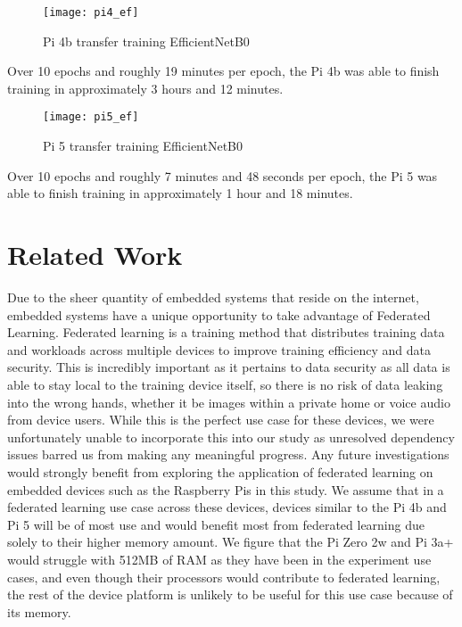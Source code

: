 \documentclass{article}
\begin{document}
\begin{multicols}{2}
\begin{figure}[H]
\texttt{[image: pi4\_ef]}
\centering
\caption{Pi 4b transfer training EfficientNetB0}
\label{fig:pi4_ef}
\end{figure}
Over 10 epochs and roughly 19 minutes per epoch, the Pi 4b was able to finish training in approximately 3 hours and 12 minutes.

\begin{figure}[H]
\texttt{[image: pi5\_ef]}
\centering
\caption{Pi 5 transfer training EfficientNetB0}
\label{fig:pi5_ef}
\end{figure}
Over 10 epochs and roughly 7 minutes and 48 seconds per epoch, the Pi 5 was able to finish training in approximately 1 hour and 18 minutes.

\section{Related Work}
Due to the sheer quantity of embedded systems that reside on the internet, embedded systems have a unique opportunity to take advantage of Federated Learning. Federated learning is a training method that distributes training data and workloads across multiple devices to improve training efficiency and data security\cite{website:fed_learning}. This is incredibly important as it pertains to data security as all data is able to stay local to the training device itself, so there is no risk of data leaking into the wrong hands, whether it be images within a private home or voice audio from device users. While this is the perfect use case for these devices, we were unfortunately unable to incorporate this into our study as unresolved dependency issues barred us from making any meaningful progress. Any future investigations would strongly benefit from exploring the application of federated learning on embedded devices such as the Raspberry Pis in this study. We assume that in a federated learning use case across these devices, devices similar to the Pi 4b and Pi 5 will be of most use and would benefit most from federated learning due solely to their higher memory amount. We figure that the Pi Zero 2w and Pi 3a+ would struggle with 512MB of RAM as they have been in the experiment use cases, and even though their processors would contribute to federated learning, the rest of the device platform is unlikely to be useful for this use case because of its memory.


\end{multicols}
\end{document}
